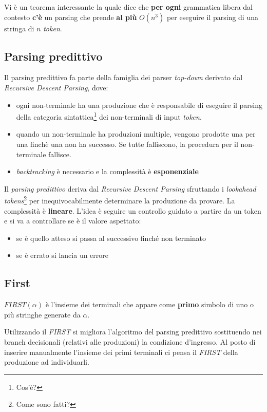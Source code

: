 Vi è un teorema interessante la quale dice che \textbf{per ogni} grammatica
libera dal contesto \textbf{c'è} un parsing che prende \textbf{al più} $O(n^3)$
per eseguire il parsing di una stringa di $n$ \textit{token}.

\subsection{Parsing predittivo}
\label{sec:parsing_predittivo}
Il parsing predittivo fa parte della famiglia dei parser \textit{top-down}
derivato dal \textit{Recursive Descent Parsing}, dove:
\begin{itemize}
\item ogni non-terminale ha una produzione che è responsabile di eseguire il
parsing della categoria sintattica\footnote{Cos'è?} dei non-terminali di input
\textit{token}.
\item quando un non-terminale ha produzioni multiple, vengono prodotte una per
una finchè una non ha successo. Se tutte falliscono, la procedura per il
non-terminale fallisce.
\item \textit{backtracking} è necessario e la complessità è
\textbf{esponenziale}
\end{itemize}

Il \textit{parsing predittivo} deriva dal \textit{Recursive Descent Parsing}
sfruttando i \textit{lookahead tokens}\footnote{Come sono fatti?} per
inequivocabilmente determinare la produzione da provare. La complessità è
\textbf{lineare}. L'idea è seguire un controllo guidato a partire da un token
e si va a controllare se è il valore aspettato:
\begin{itemize}
\item se è quello atteso si passa al successivo finché non terminato
\item se è errato si lancia un errore
\end{itemize}

\subsection{First}
\begin{definition}[First]
$FIRST(\alpha)$ è l'insieme dei terminali che appare come \textbf{primo}
simbolo di uno o più stringhe generate da $\alpha$.
\end{definition}

Utilizzando il \textit{FIRST} si migliora l'algoritmo del parsing predittivo
sostituendo nei branch decisionali (relativi alle produzioni) la condizione
d'ingresso. Al posto di inserire manualmente l'insieme dei primi terminali ci
pensa il \textit{FIRST} della produzione ad individuarli.

